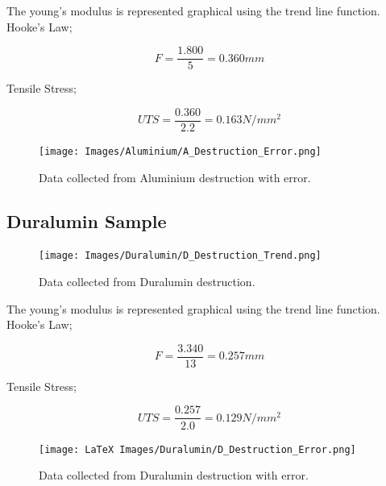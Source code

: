 \documentclass[11pt]{article}
\begin{document}
\begin{multicols}{2}
The young's modulus is represented graphical using the trend line function. \\

Hooke's Law;

\begin{equation}
{F = \dfrac{1.800}{5}=0.360mm}
\end{equation}

Tensile Stress;

\begin{equation}
{UTS = \dfrac{0.360}{2.2}=0.163N/mm^2}
\end{equation}

\begin{figure}[H]
\centering
\texttt{[image: Images/Aluminium/A\_Destruction\_Error.png]}
\caption{Data collected from Aluminium destruction with error.}
\label{Aluminium Destruction Error}
\end{figure}


\subsection{Duralumin Sample}
\label{Duralumin Sample SubSection}

\begin{figure}[H]
\centering
\texttt{[image: Images/Duralumin/D\_Destruction\_Trend.png]}
\caption{Data collected from Duralumin destruction.}
\label{Duralumin Destruction Trend}
\end{figure}

The young's modulus is represented graphical using the trend line function. \\

Hooke's Law;

\begin{equation}
{F = \dfrac{3.340}{13}=0.257mm}
\end{equation}

Tensile Stress;

\begin{equation}
{UTS = \dfrac{0.257}{2.0}=0.129N/mm^2}
\end{equation}

\begin{figure}[H]
\centering
\texttt{[image: LaTeX Images/Duralumin/D\_Destruction\_Error.png]}
\caption{Data collected from Duralumin destruction with error.}
\label{Duralumin Destruction Error}
\end{figure}


\end{multicols}
\end{document}
